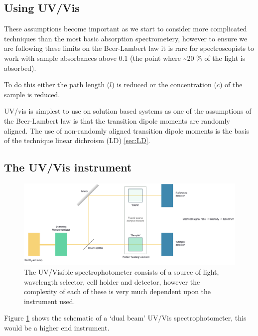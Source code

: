 \documentclass[
]{book}
\begin{document}
\hypertarget{sec:usingUV}{%
\subsection{Using UV/Vis}\label{sec:usingUV}}

These assumptions become important as we start to consider more complicated techniques than the most basic absorption spectrometery, however to ensure we are following these limits on the Beer-Lambert law it is rare for spectroscopists to work with sample absorbances above 0.1 (the point where \textasciitilde20 \% of the light is absorbed).

To do this either the path length (\(l\)) is reduced or the concentration (\(c\)) of the sample is reduced.

UV/vis is simplest to use on solution based systems as one of the assumptions of the Beer-Lambert law is that the transition dipole moments are randomly aligned. The use of non-randomly aligned transition dipole moments is the basis of the technique linear dichroism (LD) \ref{sec:LD}.

\hypertarget{sec:UVinstrument}{%
\subsection{The UV/Vis instrument}\label{sec:UVinstrument}}

\begin{figure}

{\centering \includegraphics[width=1\linewidth]{images/UVvis} 

}

\caption{The UV/Visible spectrophotometer consists of a source of light, wavelength selector, cell holder and detector, however the complexity of each of these is very much dependent upon the instrument used.}\label{fig:UV}
\end{figure}

Figure \ref{fig:UV} shows the schematic of a `dual beam' UV/Vis spectrophotometer, this would be a higher end instrument.
\end{document}
